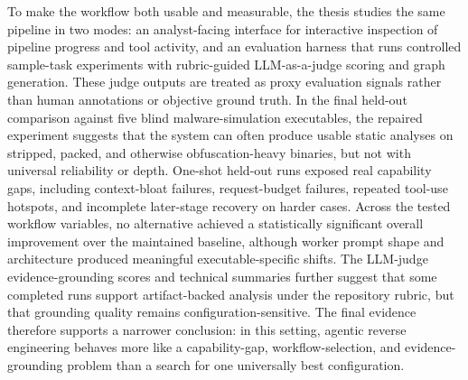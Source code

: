 To make the workflow both usable and measurable, the thesis studies the same pipeline in two modes: an analyst-facing interface for interactive inspection of pipeline progress and tool activity, and an evaluation harness that runs controlled sample-task experiments with rubric-guided LLM-as-a-judge scoring and graph generation. These judge outputs are treated as proxy evaluation signals rather than human annotations or objective ground truth. In the final held-out comparison against five blind malware-simulation executables, the repaired experiment suggests that the system can often produce usable static analyses on stripped, packed, and otherwise obfuscation-heavy binaries, but not with universal reliability or depth. One-shot held-out runs exposed real capability gaps, including context-bloat failures, request-budget failures, repeated tool-use hotspots, and incomplete later-stage recovery on harder cases. Across the tested workflow variables, no alternative achieved a statistically significant overall improvement over the maintained baseline, although worker prompt shape and architecture produced meaningful executable-specific shifts. The LLM-judge evidence-grounding scores and technical summaries further suggest that some completed runs support artifact-backed analysis under the repository rubric, but that grounding quality remains configuration-sensitive. The final evidence therefore supports a narrower conclusion: in this setting, agentic reverse engineering behaves more like a capability-gap, workflow-selection, and evidence-grounding problem than a search for one universally best configuration.

